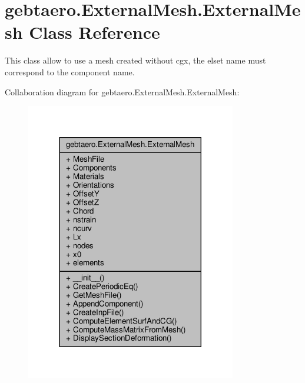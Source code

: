\hypertarget{classgebtaero_1_1_external_mesh_1_1_external_mesh}{}\section{gebtaero.\+External\+Mesh.\+External\+Mesh Class Reference}
\label{classgebtaero_1_1_external_mesh_1_1_external_mesh}


This class allow to use a mesh created without cgx, the elset name must correspond to the component name.  




Collaboration diagram for gebtaero.\+External\+Mesh.\+External\+Mesh\+:\nopagebreak
\begin{figure}[H]
\begin{center}
\leavevmode
\includegraphics[width=260pt]{classgebtaero_1_1_external_mesh_1_1_external_mesh__coll__graph}
\end{center}
\end{figure}
